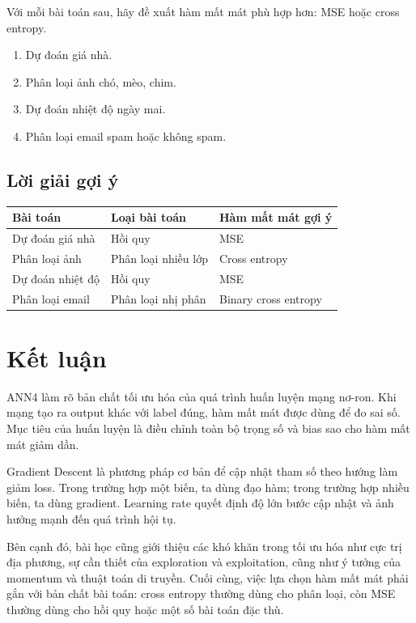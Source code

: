 \documentclass[12pt,a4paper]{report}
\begin{document}
Với mỗi bài toán sau, hãy đề xuất hàm mất mát phù hợp hơn: MSE hoặc cross entropy.

\begin{enumerate}
    \item Dự đoán giá nhà.
    \item Phân loại ảnh chó, mèo, chim.
    \item Dự đoán nhiệt độ ngày mai.
    \item Phân loại email spam hoặc không spam.
\end{enumerate}

\section*{Lời giải gợi ý}

\begin{center}
\begin{tabular}{lll}
\toprule
Bài toán & Loại bài toán & Hàm mất mát gợi ý \\
\midrule
Dự đoán giá nhà & Hồi quy & MSE \\
Phân loại ảnh & Phân loại nhiều lớp & Cross entropy \\
Dự đoán nhiệt độ & Hồi quy & MSE \\
Phân loại email & Phân loại nhị phân & Binary cross entropy \\
\bottomrule
\end{tabular}
\end{center}

\chapter*{Kết luận}

ANN4 làm rõ bản chất tối ưu hóa của quá trình huấn luyện mạng nơ-ron. Khi mạng tạo ra output khác với label đúng, hàm mất mát được dùng để đo sai số. Mục tiêu của huấn luyện là điều chỉnh toàn bộ trọng số và bias sao cho hàm mất mát giảm dần.

Gradient Descent là phương pháp cơ bản để cập nhật tham số theo hướng làm giảm loss. Trong trường hợp một biến, ta dùng đạo hàm; trong trường hợp nhiều biến, ta dùng gradient. Learning rate quyết định độ lớn bước cập nhật và ảnh hưởng mạnh đến quá trình hội tụ.

Bên cạnh đó, bài học cũng giới thiệu các khó khăn trong tối ưu hóa như cực trị địa phương, sự cần thiết của exploration và exploitation, cũng như ý tưởng của momentum và thuật toán di truyền. Cuối cùng, việc lựa chọn hàm mất mát phải gắn với bản chất bài toán: cross entropy thường dùng cho phân loại, còn MSE thường dùng cho hồi quy hoặc một số bài toán đặc thù.
\end{document}
